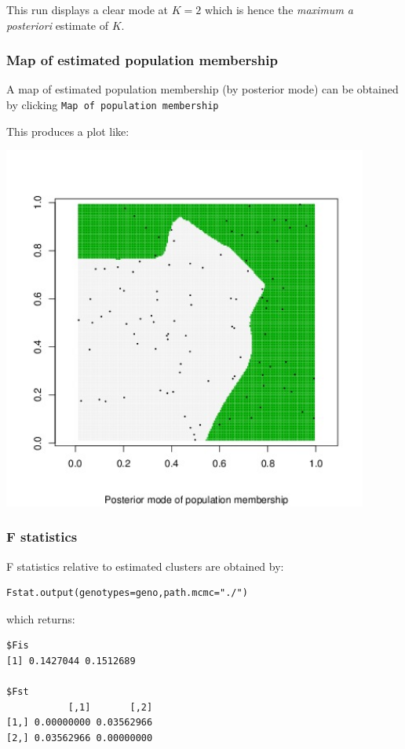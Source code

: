\documentclass[a4paper,10pt]{article}
\begin{document}
This run displays a clear mode at $K=2$ which is hence the {\em maximum a posteriori} estimate of $K$.

\clearpage
\subsubsection{Map of estimated  population membership}
A map of estimated  population membership (by posterior mode) can be obtained by clicking \texttt{Map of population membership}


This produces a plot like:\\


\centerline{\includegraphics[width=12cm]{fig/map.jpeg}}


\subsubsection{F statistics}
F statistics \cite{Weir84} relative to estimated clusters are obtained by:

\begin{verbatim}
Fstat.output(genotypes=geno,path.mcmc="./")
\end{verbatim}

which returns:

\begin{verbatim}
$Fis
[1] 0.1427044 0.1512689

$Fst
           [,1]       [,2]
[1,] 0.00000000 0.03562966
[2,] 0.03562966 0.00000000
\end{verbatim}
\end{document}
